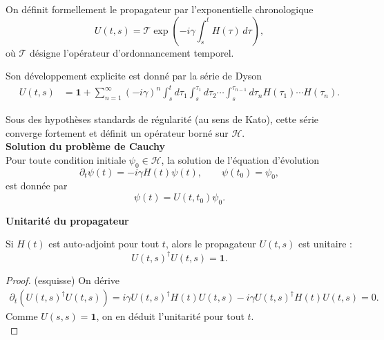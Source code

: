 On définit formellement le propagateur par l’exponentielle chronologique
\begin{equation}
    \label{eq:dyson-formal}
    U(t,s)
    =
    \mathcal T
    \exp\!\left(
    -i\gamma \int_s^t H(\tau)\,d\tau
    \right),
\end{equation}
où $\mathcal T$ désigne l’opérateur d’ordonnancement temporel.

Son développement explicite est donné par la série de Dyson
\begin{equation}
    \label{eq:dyson-series}
    \begin{aligned}
        U(t,s)
        &=
        \mathbf 1
                +
        \sum_{n=1}^{\infty}
        (-i\gamma)^n
        \int_s^t d\tau_1
        \int_s^{\tau_1} d\tau_2
        \cdots
        \int_s^{\tau_{n-1}} d\tau_n 
        H(\tau_1)\cdots H(\tau_n).
    \end{aligned}
\end{equation}

Sous des hypothèses standards de régularité (au sens de Kato), cette série
converge fortement et définit un opérateur borné sur $\mathcal H$.\\

{\bf Solution du problème de Cauchy}\\

Pour toute condition initiale $\psi_0\in\mathcal H$, la solution de l’équation
d’évolution
\begin{equation}
    \label{eq:schrodinger-abstract}
    \partial_t \psi(t) = -i\gamma H(t)\psi(t),
    \qquad
    \psi(t_0)=\psi_0,
\end{equation}
est donnée par
\begin{equation}
    \label{eq:cauchy-solution}
    \psi(t)=U(t,t_0)\psi_0.
\end{equation}

{\bf Unitarité du propagateur}\\

\begin{Prop}
Si $H(t)$ est auto-adjoint pour tout $t$, alors le propagateur $U(t,s)$ est unitaire :
\begin{equation}
    U(t,s)^\dagger  U(t,s) = \mathbf 1.
\end{equation}
\end{Prop}
\begin{proof}(esquisse)
    On dérive
    \begin{eqnarray}
        \partial_t\!\left(U(t,s)^\dagger U(t,s)\right)=i\gamma U(t,s)^\dagger H(t)U(t,s)-i\gamma U(t,s)^\dagger  H(t)U(t,s)=0.
    \end{eqnarray}
Comme $U(s,s)=\mathbf 1$, on en déduit l’unitarité pour tout $t$.\\
\end{proof}

